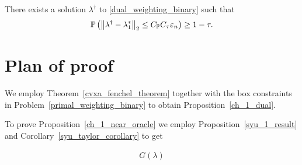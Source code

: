 \begin{proposition}
  \label{ch_1_near_oracle}
  There exists a solution $\lambda^\dagger$ 
  to \eqref{dual_weighting_binary}
  such that
  \begin{gather}
    \mathbb{P}
    \left( 
      \left\lVert
        \lambda^\dagger
        -
        \lambda^*_1
      \right\rVert_2
      \le
      C_{\mathbb{P}} C_\tau \varepsilon_n
    \right)
    \ge 
    1 - \tau
    .
  \end{gather}
\end{proposition}


\section{Plan of proof}
We employ 
Theorem~\ref{cvxa_fenchel_theorem}
together with the box constraints in Problem~\eqref{primal_weighting_binary}
to obtain Proposition~\ref{ch_1_dual}.

To prove Proposition~\ref{ch_1_near_oracle}
we employ
Proposition~\ref{syu_1_result}
and 
Corollary~\ref{syu_taylor_corollary}
to get

\begin{align}
  G(\lambda)
\end{align}
